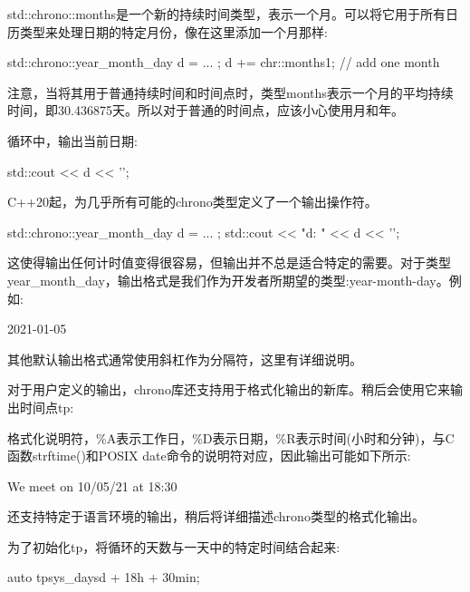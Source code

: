 std::chrono::months是一个新的持续时间类型，表示一个月。可以将它用于所有日历类型来处理日期的特定月份，像在这里添加一个月那样:

\begin{cpp}
std::chrono::year_month_day d = ... ;
d += chr::months{1}; // add one month
\end{cpp}

注意，当将其用于普通持续时间和时间点时，类型months表示一个月的平均持续时间，即30.436875天。所以对于普通的时间点，应该小心使用月和年。


循环中，输出当前日期:

\begin{cpp}
std::cout << d << '\n';
\end{cpp}

C++20起，为几乎所有可能的chrono类型定义了一个输出操作符。

\begin{cpp}
std::chrono::year_month_day d = ... ;
std::cout << "d: " << d << '\n';
\end{cpp}

这使得输出任何计时值变得很容易，但输出并不总是适合特定的需要。对于类型year\_month\_day，输出格式是我们作为开发者所期望的类型:year-month-day。例如:

\begin{shell}
2021-01-05
\end{shell}

其他默认输出格式通常使用斜杠作为分隔符，这里有详细说明。

对于用户定义的输出，chrono库还支持用于格式化输出的新库。稍后会使用它来输出时间点tp:


格式化说明符，\%A表示工作日，\%D表示日期，\%R表示时间(小时和分钟)，与C函数strftime()和POSIX date命令的说明符对应，因此输出可能如下所示:

\begin{shell}
We meet on 10/05/21 at 18:30
\end{shell}

还支持特定于语言环境的输出，稍后将详细描述chrono类型的格式化输出。


为了初始化tp，将循环的天数与一天中的特定时间结合起来:

\begin{cpp}
auto tp{sys_days{d} + 18h + 30min};
\end{cpp}

